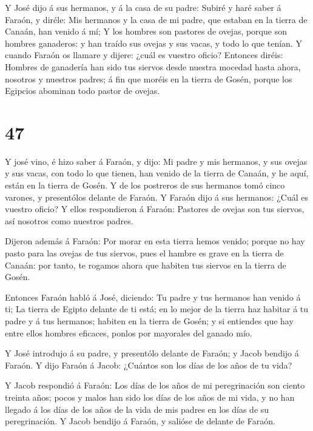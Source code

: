  Y José dijo á sus hermanos, y á la casa de su padre:
Subiré y haré saber á Faraón, y diréle: Mis hermanos y la casa de mi
padre, que estaban en la tierra de Canaán, han venido á mí;
 Y los hombres son pastores de ovejas, porque son hombres
ganaderos: y han traído sus ovejas y sus vacas, y todo lo que tenían.
 Y cuando Faraón os llamare y dijere: ¿cuál es vuestro
oficio?  Entonces diréis: Hombres de ganadería han sido tus
siervos desde nuestra mocedad hasta ahora, nosotros y nuestros padres; á
fin que moréis en la tierra de Gosén, porque los Egipcios abominan todo
pastor de ovejas.

\hypertarget{section-46}{%
\section{47}\label{section-46}}

 Y josé vino, é hizo saber á Faraón, y dijo: Mi padre y mis
hermanos, y sus ovejas y sus vacas, con todo lo que tienen, han venido
de la tierra de Canaán, y he aquí, están en la tierra de Gosén.
 Y de los postreros de sus hermanos tomó cinco varones, y
presentólos delante de Faraón.  Y Faraón dijo á sus
hermanos: ¿Cuál es vuestro oficio? Y ellos respondieron á Faraón:
Pastores de ovejas son tus siervos, así nosotros como nuestros padres.

 Dijeron además á Faraón: Por morar en esta tierra hemos
venido; porque no hay pasto para las ovejas de tus siervos, pues el
hambre es grave en la tierra de Canaán: por tanto, te rogamos ahora que
habiten tus siervos en la tierra de Gosén.

 Entonces Faraón habló á José, diciendo: Tu padre y tus
hermanos han venido á ti;  La tierra de Egipto delante de ti
está; en lo mejor de la tierra haz habitar á tu padre y á tus hermanos;
habiten en la tierra de Gosén; y si entiendes que hay entre ellos
hombres eficaces, ponlos por mayorales del ganado mío.

 Y José introdujo á su padre, y presentólo delante de
Faraón; y Jacob bendijo á Faraón.  Y dijo Faraón á Jacob:
¿Cuántos son los días de los años de tu vida?

 Y Jacob respondió á Faraón: Los días de los años de mi
peregrinación son ciento treinta años; pocos y malos han sido los días
de los años de mi vida, y no han llegado á los días de los años de la
vida de mis padres en los días de su peregrinación.  Y
Jacob bendijo á Faraón, y salióse de delante de Faraón.

